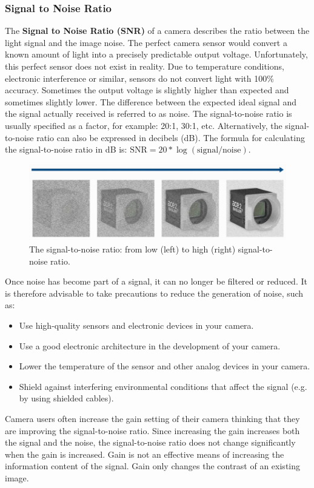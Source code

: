 \documentclass[10pt]{article}
\begin{document}
\begin{multicols}{2}
\subsubsection{Signal to Noise Ratio}
The \textbf{Signal to Noise Ratio (SNR)} of a camera describes the ratio between the light signal and the image noise.
\newline
The perfect camera sensor would convert a known amount of light into a precisely predictable output voltage. Unfortunately, this perfect sensor does not exist in reality. Due to temperature conditions, electronic interference or similar, sensors do not convert light with 100\% accuracy.
Sometimes the output voltage is slightly higher than expected and sometimes slightly lower. The difference between the expected ideal signal and the signal actually received is referred to as noise.
\newline \newline
The signal-to-noise ratio is usually specified as a factor, for example: 20:1, 30:1, etc. Alternatively, the signal-to-noise ratio can also be expressed in decibels (dB).
The formula for calculating the signal-to-noise ratio in dB is: $\text{SNR} = 20* \log (\text{signal}/\text{noise})$.
\begin{figure}[H]
    \centering
    \includegraphics[width=1\linewidth]{Images/Week 2/snr.png}
    \caption{The signal-to-noise ratio: from low (left) to high (right) signal-to-noise ratio.}
\end{figure}
Once noise has become part of a signal, it can no longer be filtered or reduced. It is therefore advisable to take precautions to reduce the generation of noise, such as:
\begin{itemize}
    \item Use high-quality sensors and electronic devices in your camera.
    \item Use a good electronic architecture in the development of your camera.
    \item Lower the temperature of the sensor and other analog devices in your camera.
    \item Shield against interfering environmental conditions that affect the signal (e.g. by using shielded cables).
\end{itemize}
Camera users often increase the gain setting of their camera thinking that they are improving the signal-to-noise ratio. Since increasing the gain increases both the signal and the noise, the signal-to-noise ratio does not change significantly when the gain is increased. Gain is not an effective means of increasing the information content of the signal. Gain only changes the contrast of an existing image.


\end{multicols}
\end{document}
